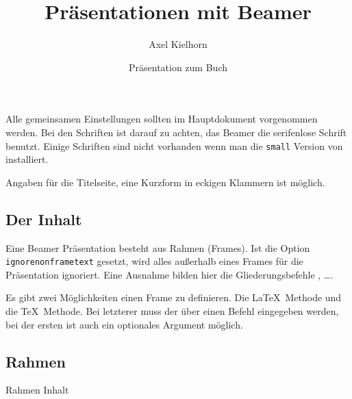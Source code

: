 Alle gemeinsamen Einstellungen sollten im Hauptdokument vorgenommen werden.
Bei den Schriften ist darauf zu achten, das Beamer die serifenlose Schrift benutzt.
Einige Schriften sind nicht vorhanden wenn man die \texttt{small} Version von 
\TeXLive{} installiert.

\begin{lfgwcode}{}
\usepackage[utf8]{inputenc}
\usepackage[german]{babel}
%
%
\usepackage[TS1,T1]{fontenc}
\usepackage{dejavu}
\end{lfgwcode}

Angaben für die Titelseite, eine Kurzform in eckigen Klammern ist möglich.

\begin{lfgwcode}{}
\title{Präsentationen mit Beamer}
\author{Axel Kielhorn}
\date[LFGW]{Präsentation zum Buch}
\end{lfgwcode}

\subsection{Der Inhalt}

\begin{lfgwcode}{}

\end{lfgwcode}

Eine Beamer Präsentation besteht aus Rahmen (Frames).
Ist die Option \texttt{ignorenonframetext} gesetzt, wird alles außerhalb
eines Frames für die Präsentation ignoriert. Eine Ausnahme bilden hier 
die Gliederungsbefehle , \dots.

Es gibt zwei Möglichkeiten einen Frame zu definieren.
Die \LaTeX\ Methode und die \TeX\ Methode. Bei letzterer muss der
 über einen Befehl eingegeben werden, bei der ersten ist
auch ein optionales Argument möglich. 

\subsection{Rahmen}
\begin{lfgwcode}{}
\begin{frame}{Rahmen}
    Inhalt
\end{frame}

\end{lfgwcode}

